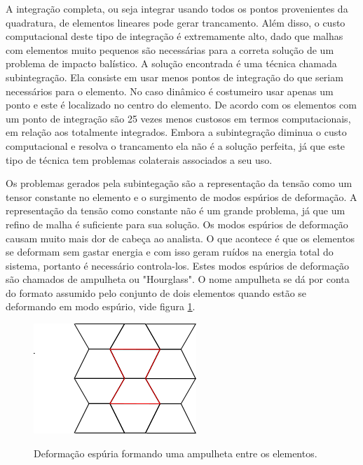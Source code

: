 A integração completa, ou seja integrar usando todos os pontos provenientes da quadratura, de elementos lineares pode gerar trancamento. Além disso, o custo computacional deste tipo de integração é extremamente alto, dado que malhas com elementos muito pequenos são necessárias para a correta solução de um problema de impacto balístico. A solução encontrada é uma técnica chamada subintegração. Ela consiste em usar menos pontos de integração do que seriam necessários para o elemento. No caso dinâmico é costumeiro usar apenas um ponto e este é localizado no centro do elemento. De acordo com \cite{theorymanls} os elementos com um ponto de integração são 25 vezes menos custosos em termos computacionais, em relação aos totalmente integrados. Embora a subintegração diminua o custo computacional e resolva o trancamento ela não é a solução perfeita, já que este tipo de técnica tem problemas colaterais associados a seu uso. \par

Os problemas gerados pela subintegação são a representação da tensão como um tensor constante no elemento e o surgimento de modos espúrios de deformação. A representação da tensão como constante não é um grande problema, já que um refino de malha é suficiente para sua solução. Os modos espúrios de deformação causam muito mais dor de cabeça ao analista. O que acontece é que os elementos se deformam sem gastar energia e com isso geram ruídos na energia total do sistema, portanto é necessário controla-los. Estes modos espúrios de deformação são chamados de ampulheta ou "Hourglass". O nome ampulheta se dá por conta do formato assumido pelo conjunto de dois elementos quando estão se deformando em modo espúrio, vide figura \ref{fig:hourglass}. 

\begin{figure}
    \centering
    \caption{Deformação espúria formando uma ampulheta entre os elementos.}
    \includegraphics[width=0.5\linewidth]{images/hourglass.png}
    \label{fig:hourglass}
\end{figure}

